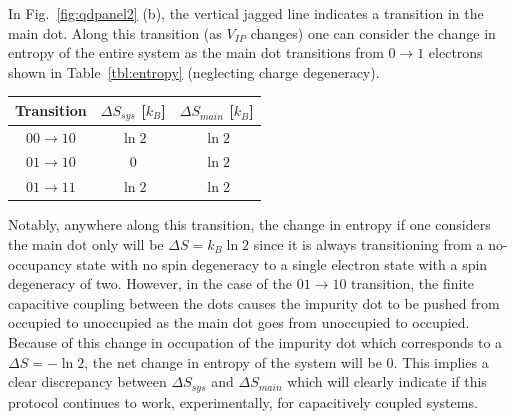 In Fig.~\ref{fig:qdpanel2} (b), the vertical jagged line indicates a transition in the main dot. Along this transition (as $V_{IP}$ changes) one can consider the change in entropy of the entire system as the main dot transitions from $0 \to 1$ electrons shown in Table~\ref{tbl:entropy} (neglecting charge degeneracy).
\begin{center}
	\begin{tabular}{ |c|c|c| } 
		\hline
		Transition & $\Delta S_{sys}$ [$k_B$] & $\Delta S_{main}$ [$k_B$]  \\ \hline\hline
		$00 \to 10$ & $\ln 2$ & $\ln 2$ \\ 
		$01 \to 10$ & 0       & $\ln 2$ \\ 
		$01 \to 11$ & $\ln 2$ & $\ln 2$ \\ 
		\hline
		\end{tabular}
		\label{tbl:entropy}
\end{center}
Notably, anywhere along this transition, the change in entropy if one considers the main dot only will be $\Delta S = k_B \ln 2$ since it is always transitioning from a no-occupancy state with no spin degeneracy to a single electron state with a spin degeneracy of two. However, in the case of the $01 \to 10$ transition, the finite capacitive coupling between the dots causes the impurity dot to be pushed from occupied to unoccupied as the main dot goes from unoccupied to occupied. Because of this change in occupation of the impurity dot which corresponds to a $\Delta S = -\ln 2$, the net change in entropy of the system will be 0. This implies a clear discrepancy between $\Delta S_{sys}$ and $\Delta S_{main}$ which will clearly indicate if this protocol continues to work, experimentally, for capacitively coupled systems.

